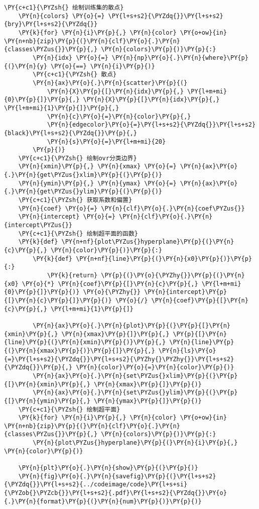\begin{Verbatim}[commandchars=\\\{\}]
    \PY{c+c1}{\PYZsh{} 绘制训练集的散点}
    \PY{n}{colors} \PY{o}{=} \PY{l+s+s2}{\PYZdq{}}\PY{l+s+s2}{bry}\PY{l+s+s2}{\PYZdq{}}
    \PY{k}{for} \PY{n}{i}\PY{p}{,} \PY{n}{color} \PY{o+ow}{in} \PY{n+nb}{zip}\PY{p}{(}\PY{n}{clf}\PY{o}{.}\PY{n}{classes\PYZus{}}\PY{p}{,} \PY{n}{colors}\PY{p}{)}\PY{p}{:}
        \PY{n}{idx} \PY{o}{=} \PY{n}{np}\PY{o}{.}\PY{n}{where}\PY{p}{(}\PY{n}{y} \PY{o}{==} \PY{n}{i}\PY{p}{)}
        \PY{c+c1}{\PYZsh{} 散点}
        \PY{n}{ax}\PY{o}{.}\PY{n}{scatter}\PY{p}{(}
            \PY{n}{X}\PY{p}{[}\PY{n}{idx}\PY{p}{,} \PY{l+m+mi}{0}\PY{p}{]}\PY{p}{,} \PY{n}{X}\PY{p}{[}\PY{n}{idx}\PY{p}{,} \PY{l+m+mi}{1}\PY{p}{]}\PY{p}{,} 
            \PY{n}{c}\PY{o}{=}\PY{n}{color}\PY{p}{,} 
            \PY{n}{edgecolor}\PY{o}{=}\PY{l+s+s2}{\PYZdq{}}\PY{l+s+s2}{black}\PY{l+s+s2}{\PYZdq{}}\PY{p}{,} 
            \PY{n}{s}\PY{o}{=}\PY{l+m+mi}{20}
        \PY{p}{)}
    \PY{c+c1}{\PYZsh{} 绘制ovr分类边界}
    \PY{n}{xmin}\PY{p}{,} \PY{n}{xmax} \PY{o}{=} \PY{n}{ax}\PY{o}{.}\PY{n}{get\PYZus{}xlim}\PY{p}{(}\PY{p}{)}
    \PY{n}{ymin}\PY{p}{,} \PY{n}{ymax} \PY{o}{=} \PY{n}{ax}\PY{o}{.}\PY{n}{get\PYZus{}ylim}\PY{p}{(}\PY{p}{)}
    \PY{c+c1}{\PYZsh{} 获取系数和偏置}
    \PY{n}{coef} \PY{o}{=} \PY{n}{clf}\PY{o}{.}\PY{n}{coef\PYZus{}}
    \PY{n}{intercept} \PY{o}{=} \PY{n}{clf}\PY{o}{.}\PY{n}{intercept\PYZus{}}
    \PY{c+c1}{\PYZsh{} 绘制超平面的函数}
    \PY{k}{def} \PY{n+nf}{plot\PYZus{}hyperplane}\PY{p}{(}\PY{n}{c}\PY{p}{,} \PY{n}{color}\PY{p}{)}\PY{p}{:}
        \PY{k}{def} \PY{n+nf}{line}\PY{p}{(}\PY{n}{x0}\PY{p}{)}\PY{p}{:}
            \PY{k}{return} \PY{p}{(}\PY{o}{\PYZhy{}}\PY{p}{(}\PY{n}{x0} \PY{o}{*} \PY{n}{coef}\PY{p}{[}\PY{n}{c}\PY{p}{,} \PY{l+m+mi}{0}\PY{p}{]}\PY{p}{)} \PY{o}{\PYZhy{}} \PY{n}{intercept}\PY{p}{[}\PY{n}{c}\PY{p}{]}\PY{p}{)} \PY{o}{/} \PY{n}{coef}\PY{p}{[}\PY{n}{c}\PY{p}{,} \PY{l+m+mi}{1}\PY{p}{]}

        \PY{n}{ax}\PY{o}{.}\PY{n}{plot}\PY{p}{(}\PY{p}{[}\PY{n}{xmin}\PY{p}{,} \PY{n}{xmax}\PY{p}{]}\PY{p}{,} \PY{p}{[}\PY{n}{line}\PY{p}{(}\PY{n}{xmin}\PY{p}{)}\PY{p}{,} \PY{n}{line}\PY{p}{(}\PY{n}{xmax}\PY{p}{)}\PY{p}{]}\PY{p}{,} \PY{n}{ls}\PY{o}{=}\PY{l+s+s2}{\PYZdq{}}\PY{l+s+s2}{\PYZhy{}\PYZhy{}}\PY{l+s+s2}{\PYZdq{}}\PY{p}{,} \PY{n}{color}\PY{o}{=}\PY{n}{color}\PY{p}{)}
        \PY{n}{ax}\PY{o}{.}\PY{n}{set\PYZus{}xlim}\PY{p}{(}\PY{p}{[}\PY{n}{xmin}\PY{p}{,} \PY{n}{xmax}\PY{p}{]}\PY{p}{)}
        \PY{n}{ax}\PY{o}{.}\PY{n}{set\PYZus{}ylim}\PY{p}{(}\PY{p}{[}\PY{n}{ymin}\PY{p}{,} \PY{n}{ymax}\PY{p}{]}\PY{p}{)}
    \PY{c+c1}{\PYZsh{} 绘制超平面}
    \PY{k}{for} \PY{n}{i}\PY{p}{,} \PY{n}{color} \PY{o+ow}{in} \PY{n+nb}{zip}\PY{p}{(}\PY{n}{clf}\PY{o}{.}\PY{n}{classes\PYZus{}}\PY{p}{,} \PY{n}{colors}\PY{p}{)}\PY{p}{:}
        \PY{n}{plot\PYZus{}hyperplane}\PY{p}{(}\PY{n}{i}\PY{p}{,} \PY{n}{color}\PY{p}{)}

    \PY{n}{plt}\PY{o}{.}\PY{n}{show}\PY{p}{(}\PY{p}{)}
    \PY{n}{fig}\PY{o}{.}\PY{n}{savefig}\PY{p}{(}\PY{l+s+s2}{\PYZdq{}}\PY{l+s+s2}{../codeimage/code}\PY{l+s+si}{\PYZob{}\PYZcb{}}\PY{l+s+s2}{.pdf}\PY{l+s+s2}{\PYZdq{}}\PY{o}{.}\PY{n}{format}\PY{p}{(}\PY{n}{num}\PY{p}{)}\PY{p}{)}
\end{Verbatim}

